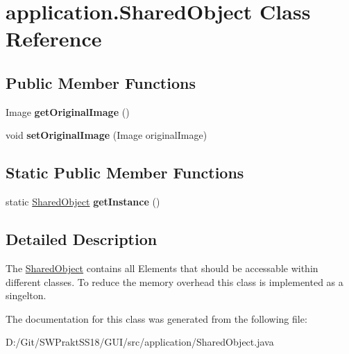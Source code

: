 \hypertarget{classapplication_1_1_shared_object}{}\section{application.\+Shared\+Object Class Reference}
\label{classapplication_1_1_shared_object}
\subsection*{Public Member Functions}
\begin{DoxyCompactItemize}
\item 
\mbox{\label{classapplication_1_1_shared_object_a089d7d6170ca682281e9b1da46144f12}} 
Image {\bfseries get\+Original\+Image} ()
\item 
\mbox{\label{classapplication_1_1_shared_object_a9fb756f502b97ba6a9743717866b1927}} 
void {\bfseries set\+Original\+Image} (Image original\+Image)
\end{DoxyCompactItemize}
\subsection*{Static Public Member Functions}
\begin{DoxyCompactItemize}
\item 
\mbox{\label{classapplication_1_1_shared_object_a35417b0510f7b9ebf85ac1656ed005ff}} 
static \mbox{\hyperlink{classapplication_1_1_shared_object}{Shared\+Object}} {\bfseries get\+Instance} ()
\end{DoxyCompactItemize}


\subsection{Detailed Description}
The \mbox{\hyperlink{classapplication_1_1_shared_object}{Shared\+Object}} contains all Elements that should be accessable within different classes. To reduce the memory overhead this class is implemented as a singelton. 

The documentation for this class was generated from the following file\+:\begin{DoxyCompactItemize}
\item 
D\+:/\+Git/\+S\+W\+Prakt\+S\+S18/\+G\+U\+I/src/application/Shared\+Object.\+java\end{DoxyCompactItemize}

